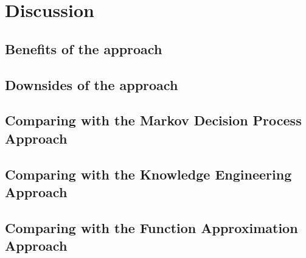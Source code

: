 \section{Discussion}
\subsection{Benefits of the approach}
\subsection{Downsides of the approach}
\subsection{Comparing with the Markov Decision Process Approach}
\subsection{Comparing with the Knowledge Engineering Approach}
\subsection{Comparing with the Function Approximation Approach}
